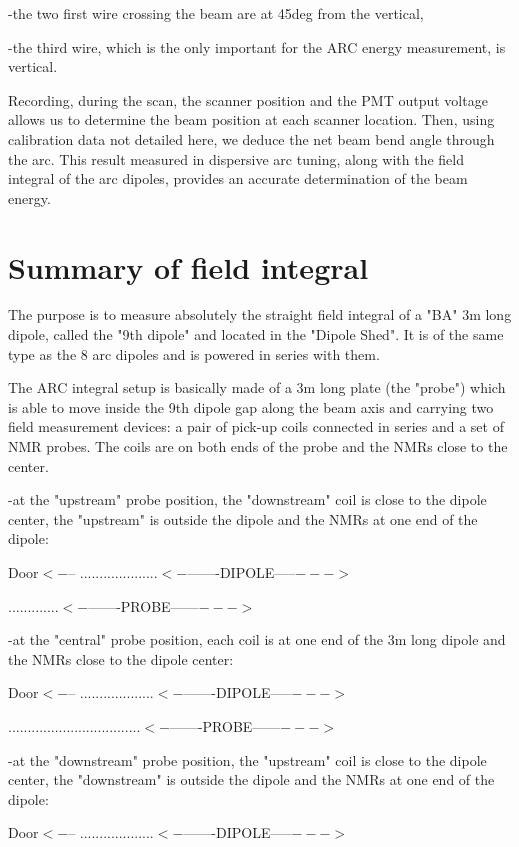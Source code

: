 {-the two first wire crossing the beam are at 45deg from the vertical, 

-the third wire, which is the only important for the ARC energy measurement,
is vertical. 

Recording, during the scan, the scanner position and the PMT output voltage
allows us to determine the beam position at each scanner location. Then, using
calibration data not detailed here, we deduce the net beam bend angle through
the arc. This result measured in dispersive arc tuning, along with the field
integral of the arc dipoles, provides an accurate determination of the beam
energy. 

\section{Summary of field integral }

The purpose is to measure absolutely the straight field integral of a 
"BA"
3m long dipole, called the "9th dipole" and located in the
"Dipole Shed". It is of the same type as the 8 arc dipoles
and is powered in series with them. 

The ARC integral setup is basically made of a 3m long plate (the 
"probe")
which is able to move inside the 9th dipole gap along the beam axis and carrying 
two
field measurement devices: a pair of pick-up coils connected in series and a
set of NMR probes. The coils are on both ends of the probe and the NMRs close
to the center. 

-at the "upstream" probe position, the 
"downstream"
coil is close to the dipole center, the "upstream" is outside
the dipole and the NMRs at one end of the dipole: 

Door$<-$-- ....................$<-$-------DIPOLE-----$--->$ 

.............$<-$-------PROBE------$--->$ 

-at the "central" probe position, each coil is at one end
of the 3m long dipole and the NMRs close to the dipole center: 

Door$<-$-- ...................$<-$-------DIPOLE-----$--->$ 

..................................$<-$-------PROBE------$--->$ 

-at the "downstream" probe position, the 
"upstream"
coil is close to the dipole center, the "downstream" is outside
the dipole and the NMRs at one end of the dipole: 

Door$<-$-- ...................$<-$-------DIPOLE-----$--->$ 

}
